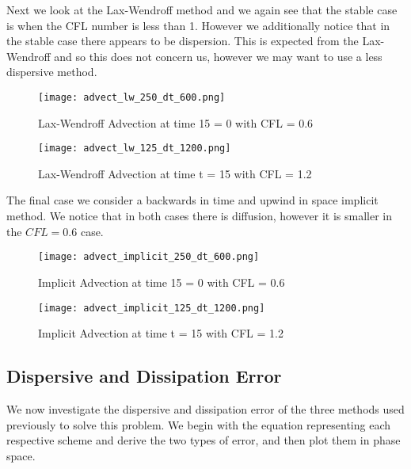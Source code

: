 \documentclass[a4paper,12pt,titlepage]{article}
\newcommand{\scale}{0.5}
\begin{document}
Next we look at the Lax-Wendroff method and we again see that the stable case is when the CFL number is less than 1.  However we additionally notice that in the stable case there appears to be dispersion.  This is expected from the Lax-Wendroff and so this does not concern us, however we may want to use a less dispersive method.
 
\begin{figure}[H]
  \begin{center}
    \texttt{[image: advect\_lw\_250\_dt\_600.png]}
    \caption{Lax-Wendroff Advection at time 15 = 0 with CFL = 0.6}
  \end{center}
\end{figure}

\begin{figure}[H]
  \begin{center}
    \texttt{[image: advect\_lw\_125\_dt\_1200.png]}
    \caption{Lax-Wendroff Advection at time t = 15 with CFL = 1.2}
  \end{center}
\end{figure}
 
The final case we consider a backwards in time and upwind in space implicit method.  We notice that in both cases there is diffusion, however it is smaller in the $CFL = 0.6$ case.

\begin{figure}[H]
  \begin{center}
    \texttt{[image: advect\_implicit\_250\_dt\_600.png]}
    \caption{Implicit Advection at time 15 = 0 with CFL = 0.6}
  \end{center}
\end{figure}

\begin{figure}[H]
  \begin{center}
    \texttt{[image: advect\_implicit\_125\_dt\_1200.png]}
    \caption{Implicit Advection at time t = 15 with CFL = 1.2}
  \end{center}
\end{figure}

\subsection{Dispersive and Dissipation Error}

We now investigate the dispersive and dissipation error of the three methods used previously to solve this problem.  We begin with the equation representing each respective scheme and derive the two types of error, and then plot them in phase space.
\end{document}
